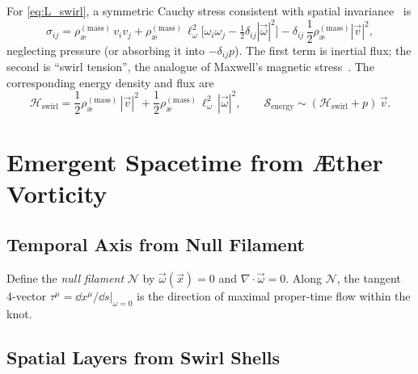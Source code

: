 \documentclass[12pt]{article}
\newcommand{\rhoa}{\rho_{\text{\ae}}^{(\text{mass})}}
\begin{document}
\begin{tcolorbox}[enhanced, breakable, sharp corners, colback=gray!2, colframe=black!40, title={Swirl-Based Hamiltonian, Time Dilation, and Emergent Geometry in VAM}]
        For \eqref{eq:L_swirl}, a symmetric Cauchy stress consistent with spatial invariance~\cite{LandauFM,Morrison1998} is
        \begin{equation}
            \sigma_{ij}
            =\rhoa\,v_i v_j
            +\rhoa\,\ell_\omega^{2}\Big[\omega_i\omega_j-\tfrac{1}{2}\delta_{ij}|\vec{\omega}|^{2}\Big]
            -\delta_{ij}\,\frac{1}{2}\rhoa|\vec{v}|^{2},
            \label{eq:swirl_stress}
        \end{equation}
        neglecting pressure (or absorbing it into \(-\delta_{ij}p\)). The first term is inertial flux; the second is “swirl tension”, the analogue of Maxwell’s magnetic stress~\cite{LambHydro,Saffman1992}. The corresponding energy density and flux are
        \begin{equation}
            \mathcal{H}_{\text{swirl}}=\frac{1}{2}\rhoa\,|\vec{v}|^{2}
            +\frac{1}{2}\rhoa\,\ell_\omega^{2}\,|\vec{\omega}|^{2},
            \qquad
            \bm{\mathcal{S}}_{\text{energy}}\sim(\mathcal{H}_{\text{swirl}}+p)\,\vec{v}.
        \end{equation}

        \section{Emergent Spacetime from Æther Vorticity}
        \label{sec:spacetime_emergence}

        \subsection{Temporal Axis from Null Filament}
        \label{subsec:null_filament_time}

        Define the \emph{null filament} \(\mathcal{N}\) by \( \vec{\omega}(\vec{x})=0\) and \(\nabla\!\cdot\!\vec{\omega}=0\). Along \(\mathcal{N}\), the tangent 4-vector \(\tau^\mu=\dd x^\mu/\dd s|_{\omega=0}\) is the direction of maximal proper-time flow within the knot.

        \subsection{Spatial Layers from Swirl Shells}
        \label{subsec:swirl_shells_space}


\end{tcolorbox}
\end{document}
